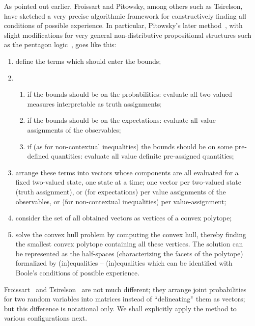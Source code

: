 \documentclass[%
  twocolumn,
 showpacs,
 showkeys,
 preprintnumbers,
 amsmath,amssymb,
 aps,
  pra,
  longbibliography,
 floatfix,
 ]{revtex4-1}
\begin{document}
As pointed out earlier, Froissart and  Pitowsky, among others such as  Tsirelson, have
sketched a very precise algorithmic framework for constructively finding all conditions of possible experience.
In particular,
Pitowsky's later method~\cite{pitowsky,pitowsky-89a,Pit-91,Pit-94,2000-poly},
with slight modifications for very general non-distributive propositional structures
such as the pentagon logic~\cite{svozil-2001-eua,svozil-2008-ql,svozil-2016-s}, goes like this:
\begin{enumerate}
\item
define the terms which should enter the bounds;


\item
\begin{enumerate}
\item
if the bounds should be on the probabilities: evaluate all two-valued measures interpretable as truth assignments;

\item
if the bounds should be on the expectations: evaluate all value assignments of the observables;

\item
if (as for non-contextual inequalities) the bounds should be on some pre-defined quantities: evaluate all value definite pre-assigned quantities;
\end{enumerate}

\item
arrange these terms into vectors whose components are all evaluated for a fixed two-valued state, one state at a time;
one vector per two-valued state (truth assignment), or (for expectations)
per value assignments of the observables, or (for non-contextual inequalities) per value-assignment;

\item
consider the set of all obtained vectors as vertices of a convex polytope;

\item
solve the convex hull problem  by computing the convex hull, thereby
finding the smallest convex polytope containing all these vertices.
The solution can be represented as
the half-spaces (characterizing the facets of the polytope) formalized by (in)equalities --
(in)equalities which  can be identified with  Boole's conditions of possible experience.


\end{enumerate}

Froissart~\cite{froissart-81} and Tsirelson~\cite{cirelson} are not much different;
they arrange joint probabilities for two random variables into matrices instead of ``delineating'' them as vectors;
but this difference is notational only. We shall explicitly apply the method to various configurations next.
\end{document}
